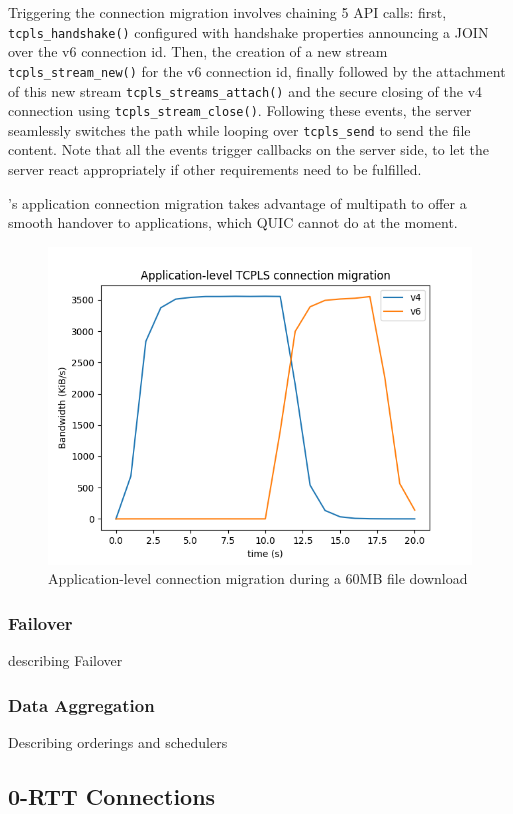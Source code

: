 Triggering the connection migration involves chaining 5 API calls:
first, \texttt{tcpls\_handshake()} configured with handshake properties announcing a
JOIN over the v6 connection id. Then, the creation of a new stream
\texttt{tcpls\_stream\_new()} for the v6 connection id, finally followed by the attachment of this new
stream \texttt{tcpls\_streams\_attach()} and the secure closing of the v4 \tcp
connection using \texttt{tcpls\_stream\_close()}. Following these events, the
server seamlessly switches the path while looping over \texttt{tcpls\_send} to
send the file content. Note that all the events trigger callbacks on the server side, to
let the server react appropriately if other requirements need to be fulfilled.

\tcpls's application connection migration takes advantage of multipath to offer
a smooth handover to applications, which QUIC cannot do at the moment.

\begin{figure}
  \centering
  \includegraphics[scale=0.5]{figures/migration.png}
  \caption{Application-level connection migration during a 60MB file download}
  \label{fig:conn_migration}
\end{figure}

\subsubsection{Failover}
describing Failover

\subsubsection{Data Aggregation}
Describing orderings and schedulers

\subsection{0-RTT Connections}

